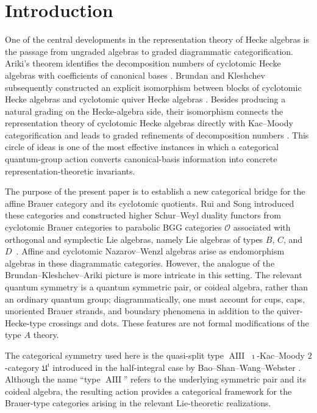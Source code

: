 \documentclass[a4,10pt]{amsart}
\numberwithin{equation}{section}
\theoremstyle{definition}
\begin{document}
\maketitle

\tableofcontents
\section{Introduction}
One of the central developments in the representation theory of Hecke algebras is the passage from ungraded algebras to graded diagrammatic categorification. Ariki’s theorem identifies the decomposition numbers of cyclotomic Hecke algebras with coefficients of canonical bases \cite{Ariki-dec}. Brundan and Kleshchev subsequently constructed an explicit isomorphism between blocks of cyclotomic Hecke algebras and cyclotomic quiver Hecke algebras \cite{BK-klr}. Besides producing a natural grading on the Hecke-algebra side, their isomorphism connects the representation theory of cyclotomic Hecke algebras directly with Kac--Moody categorification and leads to graded refinements of decomposition numbers \cite{BK-gr}. This circle of ideas is one of the most effective instances in which a categorical quantum-group action converts canonical-basis information into concrete representation-theoretic invariants.

The purpose of the present paper is to establish a new categorical
bridge for the affine Brauer category and its cyclotomic quotients.
Rui and Song introduced these categories and constructed higher
Schur--Weyl duality functors from cyclotomic Brauer categories to
parabolic BGG categories $\mathcal O$ associated with orthogonal and
symplectic Lie algebras, namely Lie algebras of types $B$, $C$, and
$D$~\cite{RS-cyc}. Affine and cyclotomic Nazarov--Wenzl algebras arise
as endomorphism algebras in these diagrammatic categories.
However, the analogue of the Brundan–Kleshchev–Ariki picture is more intricate in this setting. The relevant quantum symmetry is a quantum symmetric pair, or coideal algebra, rather than an ordinary quantum group; diagrammatically, one must account for cups, caps, unoriented Brauer strands, and boundary phenomena in addition to the quiver-Hecke-type crossings and dots. These features are not formal modifications of the type $A$ theory.

The categorical symmetry used here is the quasi-split type $\operatorname{AIII}$ $\imath$-Kac--Moody $2$-category $\mathfrak  U^{\imath}$  introduced in the half-integral case by Bao–Shan–Wang–Webster \cite{BSWW-icate}. Although the name “type $\operatorname{AIII}$” refers to the underlying symmetric pair and its coideal algebra, the resulting action provides a categorical framework for the
Brauer-type categories arising in the relevant Lie-theoretic
realizations.
\end{document}

